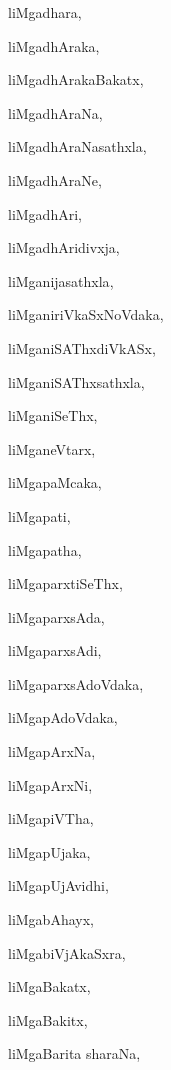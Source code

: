 \begin{multicols}{2}
{liMgadhara}, \pageref{liMgadhara}

{liMgadhAraka}, \pageref{liMgadhAraka}

{liMgadhArakaBakatx}, \pageref{liMgadhArakaBakatx}

{liMgadhAraNa}, \pageref{liMgadhAraNa}

{liMgadhAraNasathxla}, \pageref{liMgadhAraNasathxla}

{liMgadhAraNe}, \pageref{liMgadhAraNe}

{liMgadhAri}, \pageref{liMgadhAri}

{liMgadhAridivxja}, \pageref{liMgadhAridivxja}

{liMganijasathxla}, \pageref{liMganijasathxla}

{liMganiriVkaSxNoVdaka}, \pageref{liMganiriVkaSxNoVdaka}

{liMganiSAThxdiVkASx}, \pageref{liMganiSAThxdiVkASx}

{liMganiSAThxsathxla}, \pageref{liMganiSAThxsathxla}

{liMganiSeThx}, \pageref{liMganiSeThx}

{liMganeVtarx}, \pageref{liMganeVtarx}

{liMgapaMcaka}, \pageref{liMgapaMcaka}

{liMgapati}, \pageref{liMgapati}

{liMgapatha}, \pageref{liMgapatha}

{liMgaparxtiSeThx}, \pageref{liMgaparxtiSeThx}

{liMgaparxsAda}, \pageref{liMgaparxsAda}

{liMgaparxsAdi}, \pageref{liMgaparxsAdi}

{liMgaparxsAdoVdaka}, \pageref{liMgaparxsAdoVdaka}

{liMgapAdoVdaka}, \pageref{liMgapAdoVdaka}

{liMgapArxNa}, \pageref{liMgapArxNa}

{liMgapArxNi}, \pageref{liMgapArxNi}

{liMgapiVTha}, \pageref{liMgapiVTha}

{liMgapUjaka}, \pageref{liMgapUjaka}

{liMgapUjAvidhi}, \pageref{liMgapUjAvidhi}

{liMgabAhayx}, \pageref{liMgabAhayx}

{liMgabiVjAkaSxra}, \pageref{liMgabiVjAkaSxra}

{liMgaBakatx}, \pageref{liMgaBakatx}

{liMgaBakitx}, \pageref{liMgaBakitx}

{liMgaBarita sharaNa}, \pageref{liMgaBaritasharaNa}


\end{multicols}
